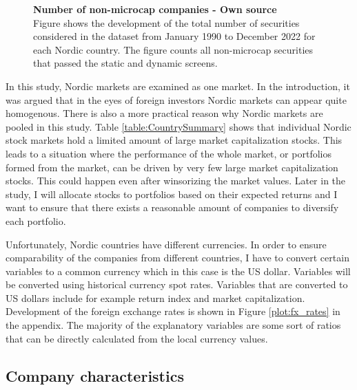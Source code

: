 \documentclass[12pt]{article}
\begin{document}
\begin{figure}[ht]
\centering
\caption[Number of non-micro-cap companies]{\textbf{Number of non-microcap companies \textnormal{- Own source}}\\ Figure shows the development of the total number of securities considered in the dataset from January 1990 to December 2022 for each Nordic country. The figure counts all non-microcap securities that passed the static and dynamic screens.}

\label{plot:number_of_companies_wo_micro}
\end{figure}

In this study, Nordic markets are examined as one market. In the introduction, it was argued that in the eyes of foreign investors Nordic markets can appear quite homogenous. There is also a more practical reason why Nordic markets are pooled in this study. Table \ref{table:CountrySummary} shows that individual Nordic stock markets hold a limited amount of large market capitalization stocks. This leads to a situation where the performance of the whole market, or portfolios formed from the market, can be driven by very few large market capitalization stocks. This could happen even after winsorizing the market values. Later in the study, I will allocate stocks to portfolios based on their expected returns and I want to ensure that there exists a reasonable amount of companies to diversify each portfolio. \par

Unfortunately, Nordic countries have different currencies. In order to ensure comparability of the companies from different countries, I have to convert certain variables to a common currency which in this case is the US dollar. Variables will be converted using historical currency spot rates. Variables that are converted to US dollars include for example return index and market capitalization. Development of the foreign exchange rates is shown in Figure \ref{plot:fx_rates} in the appendix. The majority of the explanatory variables are some sort of ratios that can be directly calculated from the local currency values. \par

\subsection{Company characteristics}\label{CompanyCharacteristics}
\end{document}
